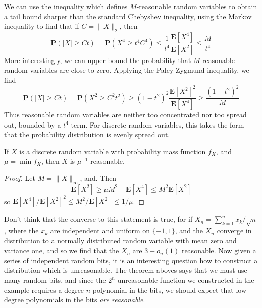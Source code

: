 We can use the inequality which defines $M$-reasonable random variables to obtain a tail bound sharper than the standard Chebyshev inequality, using the Markov inequality to find that if $C = \| X \|_2$, then
%
\[ \mathbf{P}(|X| \geq Ct) = \mathbf{P}(X^4 \geq t^4 C^4) \leq \frac{1}{t^4} \frac{\mathbf{E}[X^4]}{\mathbf{E}[X^2]} \leq \frac{M}{t^4} \]
%
More interestingly, we can upper bound the probability that $M$-reasonable random variables are close to zero. Applying the Paley-Zygmund inequality, we find
%
\[ \mathbf{P}(|X| \geq Ct) = \mathbf{P}(X^2 \geq C^2t^2) \geq (1 - t^2)^2 \frac{\mathbf{E}[X^2]^2}{\mathbf{E}[X^4]} \geq \frac{(1 - t^2)^2}{M} \]
%
Thus reasonable random variables are neither too concentrated nor too spread out, bounded by a $t^4$ term. For discrete random variables, this takes the form that the probability distribution is evenly spread out.

\begin{theorem}
    If $X$ is a discrete random variable with probability mass function $f_X$, and $\mu = \min f_X$, then $X$ is $\mu^{-1}$ reasonable.
\end{theorem}
\begin{proof}
    Let $M = \| X \|_\infty$, and. Then
    \[ \mathbf{E}[X^2] \geq \mu M^2 \ \ \ \ \ \mathbf{E}[X^4] \leq M^2 \mathbf{E}[X^2] \]
    so $\mathbf{E}[X^4]/\mathbf{E}[X^2]^2 \leq M^2/\mathbf{E}[X^2] \leq 1/\mu$.
\end{proof}

Don't think that the converse to this statement is true, for if $X_n = \sum_{k = 1}^n x_k/\sqrt{n}$, where the $x_k$ are independent and uniform on $\{ -1, 1 \}$, and the $X_n$ converge in distribution to a normally distributed random variable with mean zero and variance one, and so we find that the $X_n$ are $3 + o_n(1)$ reasonable. Now given a series of independent random bits, it is an interesting question how to construct a distribution which is unreasonable. The theorem aboves says that we must use many random bits, and since the $2^n$ unreasonable function we constructed in the example requires a degree $n$ polynomial in the bits, we should expect that low degree polynomials in the bits {\it are reasonable}.

